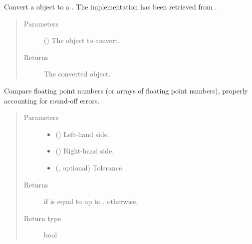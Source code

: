 \documentclass[letterpaper,10pt,english]{sphinxmanual}
\begin{document}
\begin{fulllineitems}
\label{\detokenize{api:utils.convert_datetime64_to_datetime}}
Convert a  object to a .
The implementation has been retrieved from
.
\begin{quote}\begin{description}
\item[{Parameters}] \leavevmode
{} () \textendash{} The  object to convert.

\item[{Returns}] \leavevmode
The converted  object.

\end{description}\end{quote}

\end{fulllineitems}


\begin{fulllineitems}
\label{\detokenize{api:utils.equal_to}}
Compare floating point numbers (or arrays of floating point numbers),
properly accounting for round-off errors.
\begin{quote}\begin{description}
\item[{Parameters}] \leavevmode\begin{itemize}
\item {} 
 () \textendash{} Left-hand side.

\item {} 
 () \textendash{} Right-hand side.

\item {} 
 (, optional) \textendash{} Tolerance.

\end{itemize}

\item[{Returns}] \leavevmode
{} if  is equal to  up to ,  otherwise.

\item[{Return type}] \leavevmode
bool

\end{description}\end{quote}

\end{fulllineitems}
\end{document}
